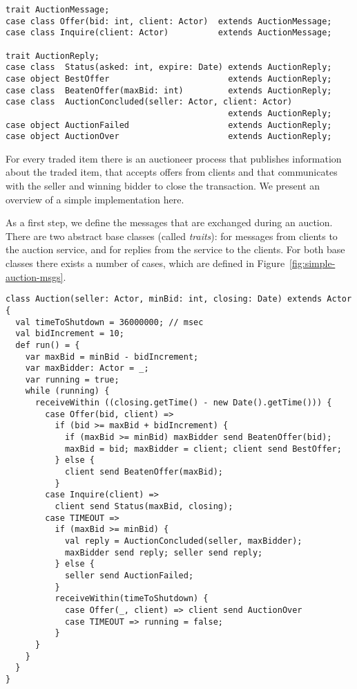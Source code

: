 \begin{lstlisting}[style=floating,label=fig:simple-auction-msgs,caption=Implementation of an Auction Service]
trait AuctionMessage;
case class Offer(bid: int, client: Actor)  extends AuctionMessage;
case class Inquire(client: Actor)          extends AuctionMessage;       

trait AuctionReply;
case class  Status(asked: int, expire: Date) extends AuctionReply;
case object BestOffer                        extends AuctionReply;
case class  BeatenOffer(maxBid: int)         extends AuctionReply;
case class  AuctionConcluded(seller: Actor, client: Actor) 
                                             extends AuctionReply;
case object AuctionFailed                    extends AuctionReply;
case object AuctionOver                      extends AuctionReply;
\end{lstlisting}

For every traded item there is an auctioneer process that publishes
information about the traded item, that accepts offers from clients
and that communicates with the seller and winning bidder to close the
transaction. We present an overview of a simple implementation
here.

As a first step, we define the messages that are exchanged during an
auction. There are two abstract base classes (called {\em traits}):
 for messages from clients to the auction
service, and  for replies from the service to the
clients.  For both base classes there exists a number of cases, which
are defined in Figure~\ref{fig:simple-auction-msgs}.

\begin{lstlisting}[style=floating,label=fig:simple-auction,caption=Implementation of an Auction Service]
class Auction(seller: Actor, minBid: int, closing: Date) extends Actor {
  val timeToShutdown = 36000000; // msec
  val bidIncrement = 10;
  def run() = {
    var maxBid = minBid - bidIncrement;
    var maxBidder: Actor = _;
    var running = true;
    while (running) {
      receiveWithin ((closing.getTime() - new Date().getTime())) {
        case Offer(bid, client) =>
          if (bid >= maxBid + bidIncrement) { 
            if (maxBid >= minBid) maxBidder send BeatenOffer(bid);
            maxBid = bid; maxBidder = client; client send BestOffer;
          } else {
            client send BeatenOffer(maxBid);
          }
        case Inquire(client) =>
          client send Status(maxBid, closing);
        case TIMEOUT =>
          if (maxBid >= minBid) {
            val reply = AuctionConcluded(seller, maxBidder);
            maxBidder send reply; seller send reply;
          } else {
            seller send AuctionFailed;
          }
          receiveWithin(timeToShutdown) {
            case Offer(_, client) => client send AuctionOver
            case TIMEOUT => running = false;
          }
      }
    }
  } 
}
\end{lstlisting}


